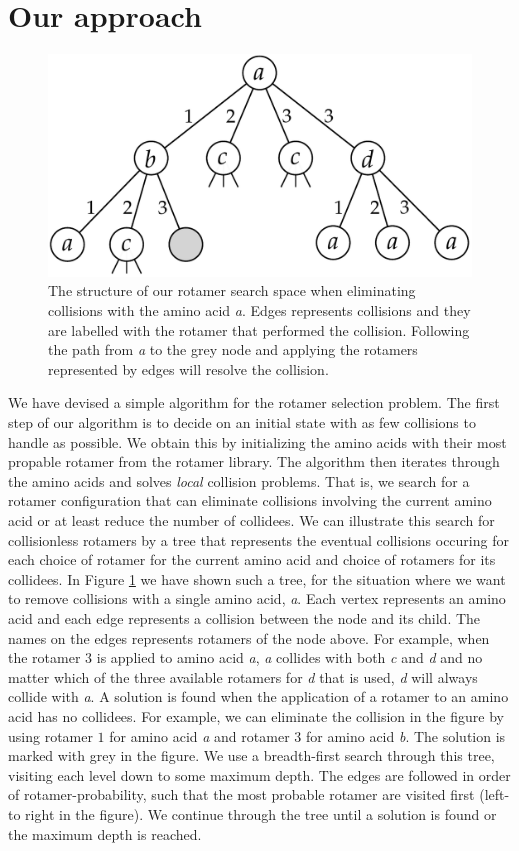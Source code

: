 \section{Our approach}
\begin{figure}
    \centering
    \includegraphics[width=.9\columnwidth]{figures/rotamersearch}
    \caption{The structure of our rotamer search space when
      eliminating collisions with the amino acid \textit{a}. Edges
      represents collisions and they are labelled with the rotamer
      that performed the collision. Following the path from \textit{a}
      to the grey node and applying the rotamers represented by edges
      will resolve the collision.}
    \label{fig:rotamer-search-tree}
\end{figure}
We have devised a simple algorithm for the rotamer selection problem.
The first step of our algorithm is to decide on an initial state with
as few collisions to handle as possible. We obtain this by
initializing the amino acids with their most propable rotamer from the
rotamer library. The algorithm then iterates through the amino acids
and solves \textit{local} collision problems. That is, we search for a
rotamer configuration that can eliminate collisions involving the
current amino acid or at least reduce the number of collidees. We can
illustrate this search for collisionless rotamers by a tree that
represents the eventual collisions occuring for each choice of rotamer
for the current amino acid and choice of rotamers for its
collidees. In Figure
\ref{fig:rotamer-search-tree} we have shown such a tree, for the
situation where we want to remove collisions with a single amino acid,
\textit{a}. Each vertex represents an amino acid and each edge
represents a collision between the node and its child. The names on
the edges represents rotamers of the node above. For example, when the
rotamer $3$ is applied to amino acid \textit{a}, \textit{a} collides
with both \textit{c} and \textit{d} and no matter which of the three
available rotamers for \textit{d} that is used, \textit{d} will always
collide with \textit{a}. A solution is found when the application of a
rotamer to an amino acid has no collidees. For example, we can
eliminate the collision in the figure by using rotamer $1$ for amino
acid \textit{a} and rotamer $3$ for amino acid
\textit{b}. The solution is marked with grey in the figure.
We use a breadth-first search through this tree, visiting
each level down to some maximum depth. The edges are followed in order
of rotamer-probability, such that the most probable rotamer are
visited first (left-to right in the figure). We continue through the
tree until a solution is found or the maximum depth is reached.

